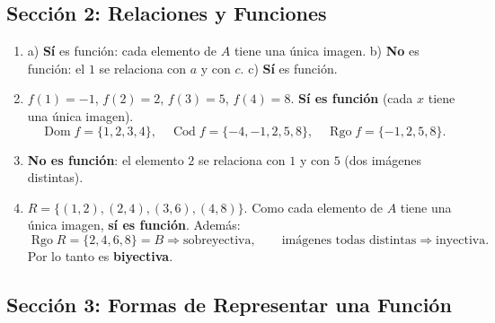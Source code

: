 \documentclass[12pt, letterpaper]{article}
\newcommand{\Dom}{\operatorname{Dom}}
\newcommand{\Cod}{\operatorname{Cod}}
\newcommand{\Rgo}{\operatorname{Rgo}}
\begin{document}
  \newpage

  \subsection*{Sección 2: Relaciones y Funciones}

  \begin{enumerate}[leftmargin=*, label=\textbf{\arabic*.}]
    \item a) \textbf{Sí} es función: cada elemento de $A$ tiene una única imagen. \quad
          b) \textbf{No} es función: el $1$ se relaciona con $a$ y con $c$. \quad
          c) \textbf{Sí} es función.

    \item $f(1) = -1$, $f(2) = 2$, $f(3) = 5$, $f(4) = 8$. \textbf{Sí es función} (cada $x$ tiene una única imagen).
          $$\Dom f = \{1,2,3,4\}, \quad \Cod f = \{-4,-1,2,5,8\}, \quad \Rgo f = \{-1,2,5,8\}.$$

    \item \textbf{No es función}: el elemento $2$ se relaciona con $1$ y con $5$ (dos imágenes distintas).

    \item $R = \{(1,2), (2,4), (3,6), (4,8)\}$.
          Como cada elemento de $A$ tiene una única imagen, \textbf{sí es función}. Además:
          $$\Rgo R = \{2,4,6,8\} = B \Rightarrow \text{sobreyectiva}, \qquad \text{imágenes todas distintas} \Rightarrow \text{inyectiva}.$$
          Por lo tanto es \textbf{biyectiva}.
  \end{enumerate}

  \newpage

  \subsection*{Sección 3: Formas de Representar una Función}
\end{document}
